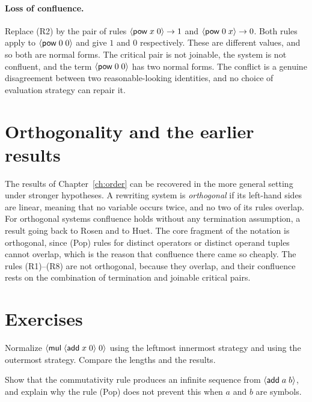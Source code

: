 \paragraph{Loss of confluence.}
Replace (R2) by the pair of rules $\langle \mathsf{pow}\; x\; 0\rangle\to1$ and $\langle \mathsf{pow}\; 0\; x\rangle\to0$. Both rules apply to $\langle \mathsf{pow}\; 0\; 0\rangle$ and give $1$ and $0$ respectively. These are different values, and so both are normal forms. The critical pair is not joinable, the system is not confluent, and the term $\langle \mathsf{pow}\; 0\; 0\rangle$ has two normal forms. The conflict is a genuine disagreement between two reasonable-looking identities, and no choice of evaluation strategy can repair it.

\section{Orthogonality and the earlier results}

The results of Chapter~\ref{ch:order} can be recovered in the more general setting under stronger hypotheses. A rewriting system is \emph{orthogonal} if its left-hand sides are linear, meaning that no variable occurs twice, and no two of its rules overlap. For orthogonal systems confluence holds without any termination assumption, a result going back to Rosen and to Huet. The core fragment of the notation is orthogonal, since (Pop) rules for distinct operators or distinct operand tuples cannot overlap, which is the reason that confluence there came so cheaply. The rules (R1)--(R8) are not orthogonal, because they overlap, and their confluence rests on the combination of termination and joinable critical pairs.

\section*{Exercises}

\begin{exercise}[\dag]\label{ex:ch8-lengths}
Normalize $\langle \mathsf{mul}\; \langle \mathsf{add}\; x\; 0\rangle\; 0\rangle$ using the leftmost innermost strategy and using the outermost strategy. Compare the lengths and the results.
\end{exercise}

\begin{exercise}
Show that the commutativity rule produces an infinite sequence from $\langle \mathsf{add}\; a\; b\rangle$, and explain why the rule (Pop) does not prevent this when $a$ and $b$ are symbols.
\end{exercise}

